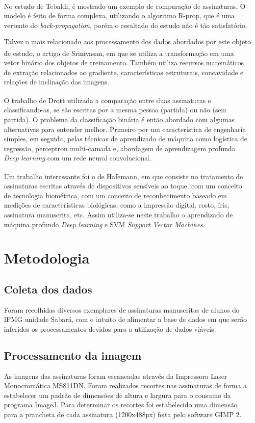 \documentclass[12pt]{article}
\begin{document}
		No estudo de Tebaldi\textsuperscript{\cite{tebaldi2007}}, é mostrado um exemplo de comparação de assinaturas. O modelo é feito de forma complexa, utilizando o algoritmo R-prop, que é uma vertente do \textit{back-propagation}, porém o resultado do estudo não é tão satisfatório.
		
		Talvez o mais relacionado aos processamento dos dados abordados por este objeto de estudo, o artigo de Srinivasan\textsuperscript{\cite{srinivasa2006}}, em que se utiliza a transformação em uma vetor binário dos objetos de treinamento. Também utiliza recursos matemáticos de extração relacionados ao gradiente, características estruturais, concavidade e relações de inclinação das imagens. 	
		
		O trabalho de Drott\textsuperscript{\cite{drott2015}} utilizada a comparação entre duas assinaturas e classificando-as, se são escritas por a mesma pessoa (partida) ou não (sem partida). O problema da classificação binária é então abordado com algumas alternativas para entender melhor. Primeiro por um característica de engenharia simples, em seguida, pelas técnicas de aprendizado de máquina como logística de regressão, perceptron multi-camada e, abordagem de aprendizagem profunda \textit{Deep learning} com um rede neural convolucional.
		
		Um trabalho interessante foi o de Hafemann\textsuperscript{\cite{hafemann2017}}, em que consiste no tratamento de assinaturas escritas através de dispositivos sensíveis ao toque, com um conceito de tecnologia biométrica, com um conceito de reconhecimento baseado em medições de características biológicas, como a impressão digital, rosto, íris, assinatura manuscrita, etc. Assim utiliza-se neste trabalho o aprendizado de máquina profundo \textit{Deep learning} e SVM \textit{Support Vector Machines}. 
	
	\section{Metodologia}
		\subsection{Coleta dos dados}
			Foram recolhidas diversos exemplares de assinaturas manuscritas de alunos do IFMG unidade Sabará, com o intuito de alimentar a base de dados em que serão inferidos os processamentos devidos para a utilização de dados viáveis.
		
		\subsection{Processamento da imagem}
			As imagens das assinaturas foram escaneadas através da Impressora Laser Monocromática MS811DN. Foram realizados recortes nas assinaturas de forma a estabelecer um padrão de dimensões de altura e largura para o consumo da programa ImageJ. Para determinar os recortes foi estabelecido uma dimensão para a prancheta de cada assinatura (1200x488px) feita pelo software GIMP 2.
			
\end{document}
